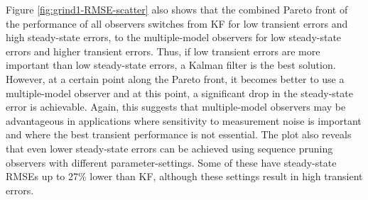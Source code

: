 Figure \ref{fig:grind1-RMSE-scatter} also shows that the combined Pareto front of the performance of all observers switches from KF for low transient errors and high steady-state errors, to the multiple-model observers for low steady-state errors and higher transient errors. Thus, if low transient errors are more important than low steady-state errors, a Kalman filter is the best solution. However, at a certain point along the Pareto front, it becomes better to use a multiple-model observer and at this point, a significant drop in the steady-state error is achievable. Again, this suggests that multiple-model observers may be advantageous in applications where sensitivity to measurement noise is important and where the best transient performance is not essential. The plot also reveals that even lower steady-state errors can be achieved using sequence pruning observers with different parameter-settings. Some of these have steady-state \gls{RMSE}s up to 27\% lower than KF, although these settings result in high transient errors.

